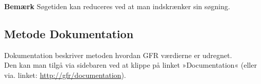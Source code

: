 \documentclass{article}
\begin{document}
\textbf{Bemærk} Søgetiden kan reduceres ved at man indskrænker sin søgning. 



\subsection{Metode Dokumentation}\label{Documentation}
Dokumentation beskriver metoden hvordan GFR værdierne er udregnet.\\ 
Den kan man tilgå via sidebaren ved at klippe på linket »Documentation« (eller via. linket: \url{http://gfr/documentation}). 
\end{document}
